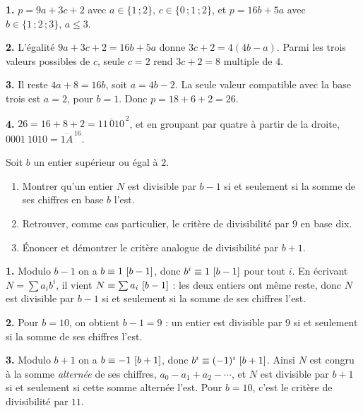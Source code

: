 \begin{corrige}
\textbf{1.} $p = 9a+3c+2$ avec $a \in \{1\,;2\}$, $c \in \{0\,;1\,;2\}$, et
$p = 16b+5a$ avec $b \in \{1\,;2\,;3\}$, $a \leq 3$.

\textbf{2.} L'égalité $9a+3c+2 = 16b+5a$ donne $3c+2 = 4(4b-a)$. Parmi les
trois valeurs possibles de $c$, seule $c = 2$ rend $3c+2 = 8$ multiple de
$4$.

\textbf{3.} Il reste $4a+8 = 16b$, soit $a = 4b-2$. La seule valeur compatible
avec la base trois est $a = 2$, pour $b = 1$. Donc
$p = 18+6+2 = 26$.

\textbf{4.} $26 = 16+8+2 = \overline{11\,010}^{\,2}$, et en groupant par
quatre à partir de la droite, $0001\ 1010 = \overline{1A}^{\,16}$.
\end{corrige}

\begin{concours}
Soit $b$ un entier supérieur ou égal à $2$.

\begin{enumerate}[label=\textbf{\arabic*.}, leftmargin=*, itemsep=0.25em]
  \item Montrer qu'un entier $N$ est divisible par $b-1$ si et seulement si la
        somme de ses chiffres en base $b$ l'est.
  \item Retrouver, comme cas particulier, le critère de divisibilité par $9$
        en base dix.
  \item Énoncer et démontrer le critère analogue de divisibilité par $b+1$.
\end{enumerate}
\end{concours}

\begin{corrige}
\textbf{1.} Modulo $b-1$ on a $b \equiv 1 \ [b-1]$, donc
$b^{i} \equiv 1 \ [b-1]$ pour tout $i$. En écrivant
$N = \sum a_{i}b^{i}$, il vient $N \equiv \sum a_{i} \ [b-1]$ : les deux
entiers ont même reste, donc $N$ est divisible par $b-1$ si et seulement si la
somme de ses chiffres l'est.

\textbf{2.} Pour $b = 10$, on obtient $b-1 = 9$ : un entier est divisible par
$9$ si et seulement si la somme de ses chiffres l'est.

\textbf{3.} Modulo $b+1$ on a $b \equiv -1 \ [b+1]$, donc
$b^{i} \equiv (-1)^{i} \ [b+1]$. Ainsi $N$ est congru à la somme
\emph{alternée} de ses chiffres, $a_{0}-a_{1}+a_{2}-\cdots$, et $N$ est
divisible par $b+1$ si et seulement si cette somme alternée l'est. Pour
$b = 10$, c'est le critère de divisibilité par $11$.
\end{corrige}

